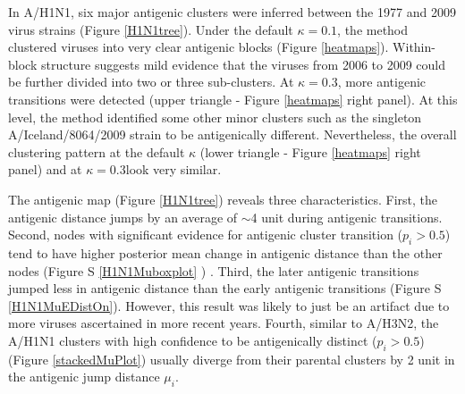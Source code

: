 \documentclass[11pt,oneside,letterpaper]{article}
\begin{document}
In A/H1N1, six major antigenic clusters were inferred between the 1977 and 2009 virus strains (Figure \ref{H1N1tree}). 
Under the default  $\kappa=0.1$, the method clustered viruses into very clear antigenic blocks  (Figure \ref{heatmaps}). 
Within-block structure suggests mild evidence that the viruses from 2006 to 2009 
could be further divided into two or three sub-clusters. 
At $\kappa=0.3$, more antigenic transitions were detected (upper triangle - Figure \ref{heatmaps} right panel).
At this level, the method identified some other minor clusters such as the singleton A/Iceland/8064/2009 strain to be antigenically different.
Nevertheless, the overall clustering pattern at the default $\kappa$ (lower triangle -  Figure \ref{heatmaps} right panel) and at $\kappa=0.3$look very similar. 










The antigenic map (Figure \ref{H1N1tree}) reveals three characteristics.
First, the antigenic distance jumps by an average of $\sim$4 unit during antigenic transitions. 
Second, nodes with significant evidence for antigenic cluster transition ($p_i > 0.5$) tend to have higher posterior mean change in antigenic distance than the other nodes (Figure S \ref{H1N1Muboxplot} ) .
Third, the later antigenic transitions jumped less in antigenic distance than the early antigenic transitions (Figure S \ref{H1N1MuEDistOn}). 
However, this result was likely to just be an artifact due to more viruses ascertained in more recent years.
Fourth, similar to A/H3N2, the A/H1N1 clusters with high confidence to be antigenically distinct ($p_i > 0.5$) (Figure \ref{stackedMuPlot}) usually diverge from their parental clusters by 2 unit in the antigenic jump distance $\mu_i$.
\end{document}
